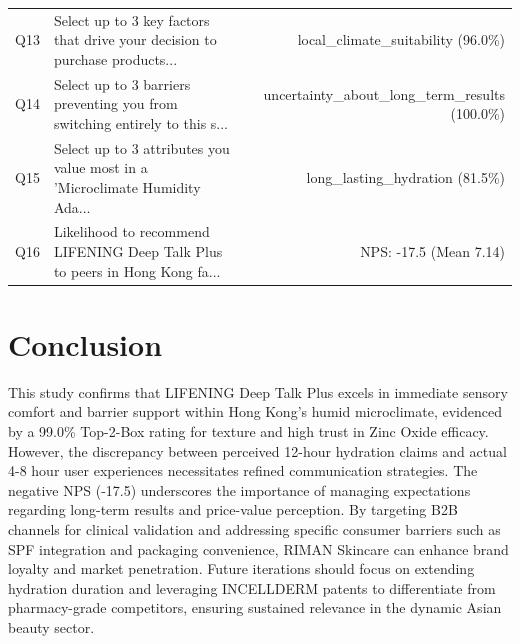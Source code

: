 \documentclass[10pt,twocolumn,a4paper]{article}
\begin{document}
\begin{table}[t]
\begin{tabularx}{\textwidth}{l X r}
Q13 & Select up to 3 key factors that drive your decision to purchase products... & local\_climate\_suitability (96.0\%) \\
Q14 & Select up to 3 barriers preventing you from switching entirely to this s... & uncertainty\_about\_long\_term\_results (100.0\%) \\
Q15 & Select up to 3 attributes you value most in a 'Microclimate Humidity Ada... & long\_lasting\_hydration (81.5\%) \\
Q16 & Likelihood to recommend LIFENING Deep Talk Plus to peers in Hong Kong fa... & NPS: -17.5 (Mean 7.14) \\
\bottomrule
\end{tabularx}
\end{table}

\section{Conclusion}
This study confirms that LIFENING Deep Talk Plus excels in immediate sensory comfort and barrier support within Hong Kong’s humid microclimate, evidenced by a 99.0\% Top-2-Box rating for texture and high trust in Zinc Oxide efficacy. However, the discrepancy between perceived 12-hour hydration claims and actual 4-8 hour user experiences necessitates refined communication strategies. The negative NPS (-17.5) underscores the importance of managing expectations regarding long-term results and price-value perception. By targeting B2B channels for clinical validation and addressing specific consumer barriers such as SPF integration and packaging convenience, RIMAN Skincare can enhance brand loyalty and market penetration. Future iterations should focus on extending hydration duration and leveraging INCELLDERM patents to differentiate from pharmacy-grade competitors, ensuring sustained relevance in the dynamic Asian beauty sector.
\end{document}
